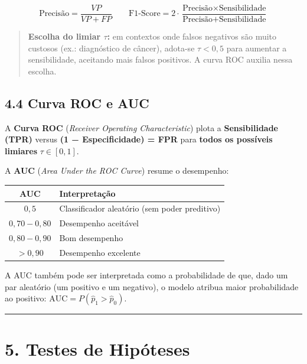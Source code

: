 \documentclass[
  letterpaper,
  DIV=11,
  numbers=noendperiod]{scrartcl}
\newcounter{none} %
\begin{document}
\[\text{Precisão} = \frac{VP}{VP+FP} \qquad \text{F1-Score} = 2\cdot\frac{\text{Precisão} \times \text{Sensibilidade}}{\text{Precisão} + \text{Sensibilidade}}\]

\begin{quote}
\textbf{Escolha do limiar \(\tau\):} em contextos onde falsos negativos
são muito custosos (ex.: diagnóstico de câncer), adota-se
\(\tau < 0{,}5\) para aumentar a sensibilidade, aceitando mais falsos
positivos. A curva ROC auxilia nessa escolha.
\end{quote}

\subsection{4.4 Curva ROC e AUC}\label{curva-roc-e-auc}

A \textbf{Curva ROC} (\emph{Receiver Operating Characteristic}) plota a
\textbf{Sensibilidade (TPR)} versus \textbf{(1 − Especificidade) = FPR}
para \textbf{todos os possíveis limiares} \(\tau \in [0,1]\).

A \textbf{AUC} (\emph{Area Under the ROC Curve}) resume o desempenho:

{\def\LTcaptype{none} %
\begin{longtable}[]{@{}cl@{}}
\toprule\noalign{}
AUC & Interpretação \\
\midrule\noalign{}
\endhead
\bottomrule\noalign{}
\endlastfoot
\(0{,}5\) & Classificador aleatório (sem poder preditivo) \\
\(0{,}70 - 0{,}80\) & Desempenho aceitável \\
\(0{,}80 - 0{,}90\) & Bom desempenho \\
\(> 0{,}90\) & Desempenho excelente \\
\end{longtable}
}

A AUC também pode ser interpretada como a probabilidade de que, dado um
par aleatório (um positivo e um negativo), o modelo atribua maior
probabilidade ao positivo: \(\text{AUC} = P(\hat{p}_1 > \hat{p}_0)\).

\begin{center}\rule{0.5\linewidth}{0.5pt}\end{center}

\section{5. Testes de Hipóteses}\label{testes-de-hipuxf3teses}
\end{document}
